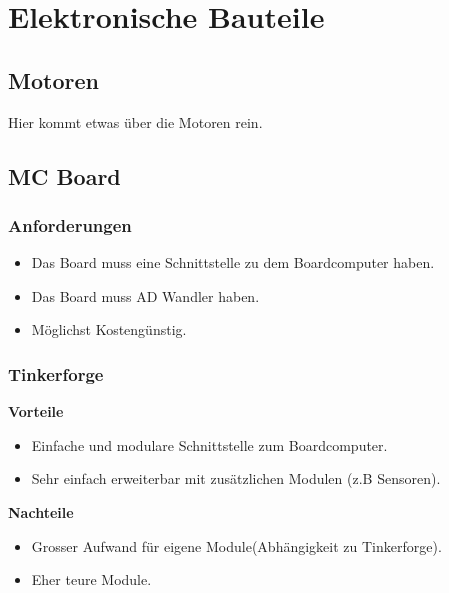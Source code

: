 \section{Elektronische Bauteile}
\subsection {Motoren}
Hier kommt etwas über die Motoren rein.

\subsection*{MC Board}
\subsubsection{Anforderungen}
\begin{itemize}
\item Das Board muss eine Schnittstelle zu dem Boardcomputer haben.
\item Das Board muss AD Wandler haben.
\item Möglichst Kostengünstig.
\end{itemize}


\subsubsection{Tinkerforge}
\textbf {Vorteile}
\begin{itemize}
\item Einfache und modulare Schnittstelle zum Boardcomputer.
\item Sehr einfach erweiterbar mit zusätzlichen Modulen (z.B Sensoren).\\
\end{itemize}
\textbf {Nachteile}
\begin{itemize}
\item Grosser Aufwand für eigene Module(Abhängigkeit zu Tinkerforge).
\item Eher teure Module.		
\end{itemize}


